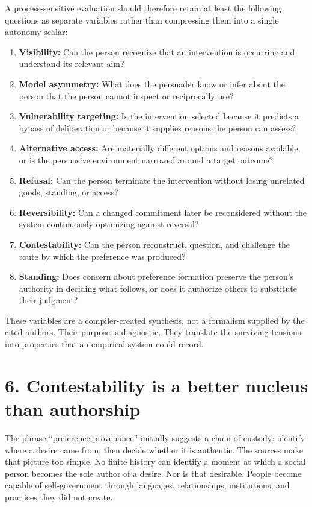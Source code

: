 \documentclass[
  10pt,
]{article}
\providecommand{\tightlist}{%
  \setlength{\itemsep}{0pt}\setlength{\parskip}{0pt}}
\begin{document}
A process-sensitive evaluation should therefore retain at least the
following questions as separate variables rather than compressing them
into a single autonomy scalar:

\begin{enumerate}
\def\labelenumi{\arabic{enumi}.}
\tightlist
\item
  \textbf{Visibility:} Can the person recognize that an intervention is
  occurring and understand its relevant aim?
\item
  \textbf{Model asymmetry:} What does the persuader know or infer about
  the person that the person cannot inspect or reciprocally use?
\item
  \textbf{Vulnerability targeting:} Is the intervention selected because
  it predicts a bypass of deliberation or because it supplies reasons
  the person can assess?
\item
  \textbf{Alternative access:} Are materially different options and
  reasons available, or is the persuasive environment narrowed around a
  target outcome?
\item
  \textbf{Refusal:} Can the person terminate the intervention without
  losing unrelated goods, standing, or access?
\item
  \textbf{Reversibility:} Can a changed commitment later be reconsidered
  without the system continuously optimizing against reversal?
\item
  \textbf{Contestability:} Can the person reconstruct, question, and
  challenge the route by which the preference was produced?
\item
  \textbf{Standing:} Does concern about preference formation preserve
  the person's authority in deciding what follows, or does it authorize
  others to substitute their judgment?
\end{enumerate}

These variables are a compiler-created synthesis, not a formalism
supplied by the cited authors. Their purpose is diagnostic. They
translate the surviving tensions into properties that an empirical
system could record.

\section{6. Contestability is a better nucleus than
authorship}\label{contestability-is-a-better-nucleus-than-authorship}

The phrase ``preference provenance'' initially suggests a chain of
custody: identify where a desire came from, then decide whether it is
authentic. The sources make that picture too simple. No finite history
can identify a moment at which a social person becomes the sole author
of a desire. Nor is that desirable. People become capable of
self-government through languages, relationships, institutions, and
practices they did not create.
\end{document}
